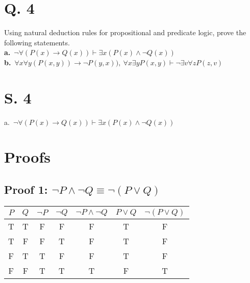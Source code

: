 \documentclass[11pt]{article}
\begin{document}
\newpage
\section*{Q. 4}
Using natural deduction rules for propositional and predicate logic, prove the following statements.\\

\textbf{a.}\ $ \neg \forall (P(x) \rightarrow Q(x)) \vdash \exists x (P(x) \land \neg Q(x)) $\\

\textbf{b.}\ $ \forall x \forall y (P(x, y)) \rightarrow \neg P(y, x)),\ \forall x \exists y P(x, y) \vdash \neg \exists v \forall z P(z, v) $\\

\section*{S. 4}

\begin{center}
    a.\ $ \neg \forall (P(x) \rightarrow Q(x)) \vdash \exists x (P(x) \land \neg Q(x)) $\\
    \begin{fitchproof}
    \end{fitchproof}
\end{center}

\newpage
\section*{\hfil Proofs \hfil}

\subsection*{Proof 1: $ \neg P \land \neg Q \equiv \neg (P \lor Q) $}
\begin{center}
    \begin{tabular}{c|c|c|c|c|c|c}
        $ P $ & $ Q $ & $ \neg P $ & $ \neg Q $ & $ \neg P \land \neg Q $ & $ P \lor Q $ & $ \neg (P \lor Q) $\\
        \hline
        T & T & F & F & F & T & F\\
        T & F & F & T & F & T & F\\
        F & T & T & F & F & T & F\\
        F & F & T & T & T & F & T\\
    \end{tabular}
\end{center}
\end{document}
